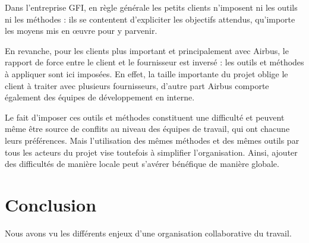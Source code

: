 \begin{app}
Dans l'entreprise GFI, en règle générale les petits clients n'imposent ni les outils ni les méthodes : ils se contentent d'expliciter les objectifs attendus, qu'importe les moyens mis en œuvre pour y parvenir.

En revanche, pour les clients plus important et principalement avec Airbus, le rapport de force entre le client et le fournisseur est inversé : les outils et méthodes à appliquer sont ici imposées. En effet, la taille importante du projet oblige le client à traiter avec plusieurs fournisseurs, d'autre part Airbus comporte également des équipes de développement en interne.

Le fait d'imposer ces outils et méthodes constituent une difficulté et peuvent même être source de conflits au niveau des équipes de travail, qui ont chacune leurs préférences. Mais l'utilisation des mêmes méthodes et des mêmes outils par tous les acteurs du projet vise toutefois à simplifier l'organisation. Ainsi, ajouter des difficultés de manière locale peut s'avérer bénéfique de manière globale.
\end{app}

\section{Conclusion}

Nous avons vu les différents enjeux d'une organisation collaborative du travail.
